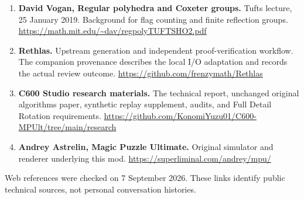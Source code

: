 \documentclass[
  10pt,
  a4paper,
]{article}
\begin{document}
\begin{enumerate}
\item
  \textbf{David Vogan, Regular polyhedra and Coxeter groups.} Tufts
  lecture, 25 January 2019. Background for flag counting and finite
  reflection groups. \url{https://math.mit.edu/~dav/regpolyTUFTSHO2.pdf}
\item
  \textbf{Rethlas.} Upstream generation and independent
  proof-verification workflow. The companion provenance describes the
  local I/O adaptation and records the actual review outcome.
  \url{https://github.com/frenzymath/Rethlas}
\item
  \textbf{C600 Studio research materials.} The technical report,
  unchanged original algorithms paper, synthetic replay supplement,
  audits, and Full Detail Rotation requirements.
  \url{https://github.com/KonomiYuzu01/C600-MPUlt/tree/main/research}
\item
  \textbf{Andrey Astrelin, Magic Puzzle Ultimate.} Original simulator
  and renderer underlying this mod.
  \url{https://superliminal.com/andrey/mpu/}
\end{enumerate}

Web references were checked on 7 September 2026. These links identify
public technical sources, not personal conversation histories.
\end{document}
